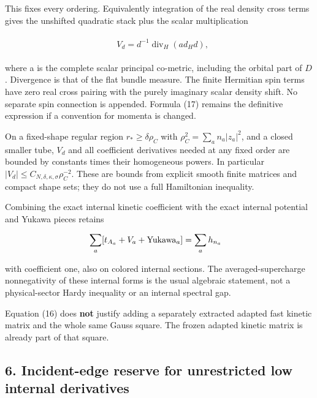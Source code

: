This fixes every ordering. Equivalently integration of the real density
cross terms gives the unshifted quadratic stack plus the scalar
multiplication

\begin{gather*}
\begin{aligned}
& V_{d}=d^{-1} \operatorname{div} _{H}(a d_{H} d),
\end{aligned}\tag{18}
\end{gather*}

where a is the complete scalar principal co-metric, including the
orbital part of \(D\). Divergence is that of the flat bundle measure.
The finite Hermitian spin terms have zero real cross pairing with the
purely imaginary scalar density shift. No separate spin connection is
appended. Formula (17) remains the definitive expression if a convention
for momenta is changed.

On a fixed-shape regular region \(r_{*}\ge \delta  \rho _{C}\) with
\(\rho _{C}^{2}=\sum _{a} n_{a}\vert z_{a}\vert ^{2}\), and a closed
smaller tube, \(V_{d}\) and all coefficient derivatives needed at any
fixed order are bounded by constants times their homogeneous powers. In
particular
\(\vert V_{d}\vert \le C_{N,\delta ,\kappa ,\sigma} \rho _{C}^{-2}\).
These are bounds from explicit smooth finite matrices and compact shape
sets; they do not use a full Hamiltonian inequality.

Combining the exact internal kinetic coefficient with the exact internal
potential and Yukawa pieces retains

\begin{gather*}
\begin{aligned}
& \sum _{a} [t_{A_{a}}+V_{a}+\mathrm{Yukawa}_{a}]=\sum _{a} h_{n_{a}}
\end{aligned}\notag
\end{gather*}

with coefficient one, also on colored internal sections. The
averaged-supercharge nonnegativity of these internal forms is the usual
algebraic statement, not a physical-sector Hardy inequality or an
internal spectral gap.

Equation (16) does \textbf{not} justify adding a separately extracted
adapted fast kinetic matrix and the whole same Gauss square. The frozen
adapted kinetic matrix is already part of that square.

\subsection{6. Incident-edge reserve for unrestricted low internal
derivatives}\label{a-incident-edge-reserve-for-unrestricted-low-internal-derivatives}

